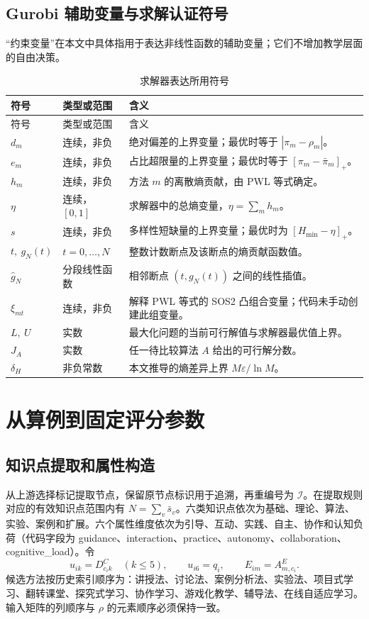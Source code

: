 \documentclass[UTF8,11pt,a4paper,fontset=fandol]{ctexart}
\newcommand{\I}{\mathcal I}
\begin{document}
\subsection{Gurobi 辅助变量与求解认证符号}
“约束变量”在本文中具体指用于表达非线性函数的辅助变量；它们不增加教学层面的自由决策。
\small
\begin{longtable}{p{}p{}p{}}
\caption{求解器表达所用符号}\\
\toprule 符号 & 类型或范围 & 含义 \\ \midrule\endfirsthead
\toprule 符号 & 类型或范围 & 含义 \\ \midrule\endhead
\bottomrule\endfoot
$d_m$ & 连续，非负 & 绝对偏差的上界变量；最优时等于 $|\pi_m-\rho_m|$。\\
$e_m$ & 连续，非负 & 占比超限量的上界变量；最优时等于 $[\pi_m-\bar\pi_m]_+$。\\
$h_m$ & 连续，非负 & 方法 $m$ 的离散熵贡献，由 PWL 等式确定。\\
$\eta$ & 连续，$[0,1]$ & 求解器中的总熵变量，$\eta=\sum_mh_m$。\\
$s$ & 连续，非负 & 多样性短缺量的上界变量；最优时为 $[H_{\min}-\eta]_+$。\\
$t,\ g_N(t)$ & $t=0,\ldots,N$ & 整数计数断点及该断点的熵贡献函数值。\\
$\widehat g_N$ & 分段线性函数 & 相邻断点 $(t,g_N(t))$ 之间的线性插值。\\
$\xi_{mt}$ & 连续，非负 & 解释 PWL 等式的 SOS2 凸组合变量；代码未手动创建此组变量。\\
$L,\ U$ & 实数 & 最大化问题的当前可行解值与求解器最优值上界。\\
$J_A$ & 实数 & 任一待比较算法 $A$ 给出的可行解分数。\\
$\delta_H$ & 非负常数 & 本文推导的熵差异上界 $M\varepsilon/\ln M$。\\
\end{longtable}
\normalsize

\section{从算例到固定评分参数}
\subsection{知识点提取和属性构造}
从上游选择标记提取节点，保留原节点标识用于追溯，再重编号为 $\I$。在提取规则对应的有效知识点范围内有 $N=\sum_v\bar s_v$。六类知识点依次为基础、理论、算法、实验、案例和扩展。六个属性维度依次为引导、互动、实践、自主、协作和认知负荷（代码字段为 guidance、interaction、practice、autonomy、collaboration、cognitive\_load）。令
\begin{equation}
 u_{ik}=D^C_{c_i k}\quad(k\le5),\qquad u_{i6}=q_i,\qquad E_{im}=A^E_{m,c_i}.
 \label{eq:input}
\end{equation}
候选方法按历史索引顺序为：讲授法、讨论法、案例分析法、实验法、项目式学习、翻转课堂、探究式学习、协作学习、游戏化教学、辅导法、在线自适应学习。输入矩阵的列顺序与 $\rho$ 的元素顺序必须保持一致。
\end{document}
